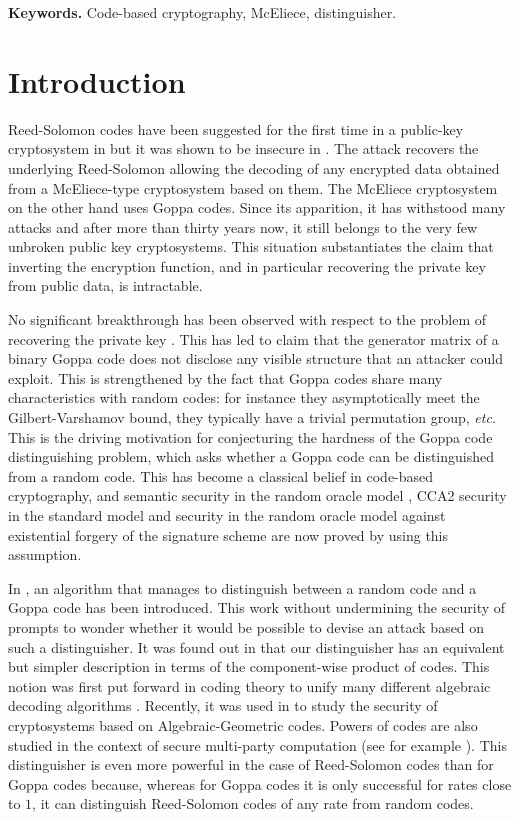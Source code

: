 \documentclass[runningheads,11pt]{llncs}
\begin{document}
\textbf{Keywords.} Code-based cryptography, McEliece, distinguisher.


\section{Introduction}
 



Reed-Solomon codes have been suggested for the first time in a public-key
cryptosystem in \cite{Niederreiter86} but it was shown to be insecure in 
\cite{SidelShesta92}. The attack recovers the underlying Reed-Solomon
allowing the decoding of any encrypted data obtained from a McEliece-type 
cryptosystem based on them. The McEliece cryptosystem
\cite{McEliece78} on the other hand uses Goppa codes.
Since its apparition, it has withstood many attacks and after more than thirty years now, it still belongs 
to the very few unbroken public key cryptosystems. This situation substantiates the claim that inverting 
the encryption function, and in particular recovering the private key from public data, is intractable. 

No significant  breakthrough has been observed with respect to the problem of 
recovering the private key \cite{Gib91,LS01}. This has led to claim that the generator matrix of a binary Goppa 
code does not disclose any visible structure that an attacker could exploit. This is strengthened by the fact that Goppa codes
share many characteristics with random codes: for instance they asymptotically meet the Gilbert-Varshamov bound, they typically have 
a trivial permutation group, \textit{etc.}  
This is the driving motivation for conjecturing the hardness of the Goppa code distinguishing problem, which asks whether a Goppa code can be 
distinguished from a random code. This has become 
a classical belief in code-based cryptography, and semantic security
in the random oracle model \cite{NojimaIKM08}, CCA2 security in the standard model \cite{DowsleyMN09} and security in the random oracle model 
against existential forgery \cite{Dallot07} of the signature scheme \cite{CouFinSen01} are now proved by using this assumption.

\medskip

In \cite{FGOPT11a}, an algorithm  that manages to 
distinguish between a random code and a Goppa code has been introduced.
This work without undermining the security of \cite{McEliece78}
prompts to wonder whether it would be possible to devise an attack based 
on such a distinguisher. 
It was found out in \cite{MP12a} that our distinguisher \cite{FGOPT11a} has an equivalent but simpler description
in terms of the component-wise product of codes. This notion was first put forward in coding theory to unify many 
different algebraic decoding algorithms \cite{Pel92,Kot92a}. Recently, it was used in \cite{CMP11}
to study the security of cryptosystems based on Algebraic-Geometric codes.
Powers of codes are also studied in the context of secure multi-party computation (see for example \cite{Cramer09,Cramer11}).
This distinguisher is even more powerful in the case of Reed-Solomon codes 
than for Goppa codes because,
whereas for Goppa codes it is only successful for rates close to $1$, it can distinguish 
Reed-Solomon codes of any rate from random codes. 
\end{document}

